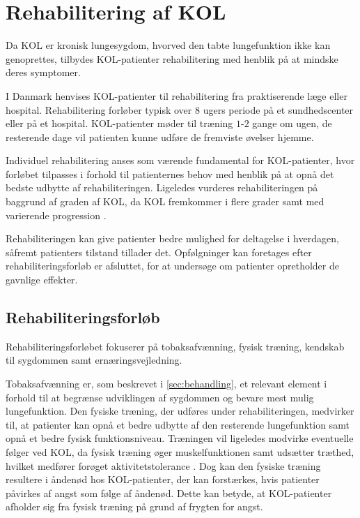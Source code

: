 \section{Rehabilitering af KOL}
Da KOL er kronisk lungesygdom, hvorved den tabte lungefunktion ikke kan genoprettes, tilbydes KOL-patienter rehabilitering med henblik på at mindske deres symptomer. 

I Danmark henvises KOL-patienter til rehabilitering fra praktiserende læge eller hospital. Rehabilitering forløber typisk over $8$ ugers periode på et sundhedscenter eller på et hospital. KOL-patienter møder til træning $1$-$2$ gange om ugen, de resterende dage vil patienten kunne udføre de fremviste øvelser hjemme. \cite{McCarthy2015,Frausing2011b} 

Individuel rehabilitering anses som værende fundamental for KOL-patienter, hvor forløbet tilpasses i forhold til patienternes behov med henblik på at opnå det bedste udbytte af rehabiliteringen. \cite{McCarthy2015,Habraken2011,Sundhedsstyrelsen2015} Ligeledes vurderes rehabiliteringen på baggrund af graden af KOL, da KOL fremkommer i flere grader samt med varierende progression \cite{McCarthy2015}. 

Rehabiliteringen kan give patienter bedre mulighed for deltagelse i hverdagen, såfremt patienters tilstand tillader det. \cite{McCarthy2015,Habraken2011, Sundhedsstyrelsen2015} Opfølgninger kan foretages efter rehabiliteringsforløb er afsluttet, for at undersøge om patienter opretholder de gavnlige effekter. \cite{Frausing2011b}


\subsection{Rehabiliteringsforløb}
Rehabiliteringsforløbet fokuserer på tobaksafvænning, fysisk træning, kendskab til sygdommen samt ernæringsvejledning. \cite{McCarthy2015,Habraken2011,Sundhedsstyrelsen2015} 

Tobaksafvænning er, som beskrevet i \autoref{sec:behandling}, et relevant element i forhold til at begrænse udviklingen af sygdommen og bevare mest mulig lungefunktion. Den fysiske træning, der udføres under rehabiliteringen, medvirker til, at patienter kan opnå et bedre udbytte af den resterende lungefunktion samt opnå et bedre fysisk funktionsniveau. \cite{Sundhedsstyrelsen2015}
Træningen vil ligeledes modvirke eventuelle følger ved KOL, da fysisk træning øger muskelfunktionen samt udsætter træthed, hvilket medfører forøget aktivitetstolerance \cite{McCarthy2015}. Dog kan den fysiske træning resultere i åndenød hos KOL-patienter, der kan forstærkes, hvis patienter påvirkes af angst som følge af åndenød. Dette kan betyde, at KOL-patienter afholder sig fra fysisk træning på grund af frygten for angst. \cite{McCarthy2015, Sundhedsstyrelsen2015} 

